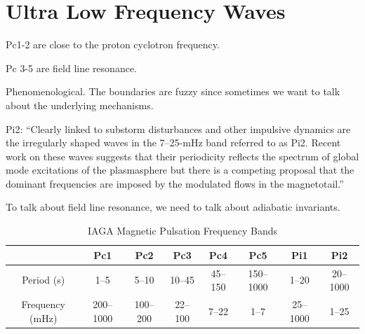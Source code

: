 
\chapter{Ultra Low Frequency Waves}
  \label{ch_waves}



Pc1-2 are close to the proton cyclotron frequency. 

Pc 3-5 are field line resonance. 

Phenomenological. The boundaries are fuzzy since sometimes we want to talk about the underlying mechanisms. 

Pi2: ``Clearly linked to substorm disturbances and other impulsive dynamics are the irregularly shaped waves in the 7--25-mHz band referred to as Pi2. Recent work on these waves suggests that their periodicity reflects the spectrum of global mode excitations of the plasmasphere but there is a competing proposal that the dominant frequencies are imposed by the modulated flows in the magnetotail.''\cite{kivelson_2006}

To talk about field line resonance, we need to talk about adiabatic invariants. 


\begin{longtable}{ @{\extracolsep{\fill}} cccccccc @{\extracolsep{\fill}} }
  \caption[IAGA Magnetic Pulsation Frequency Bands]{IAGA Magnetic Pulsation Frequency Bands\cite{jacobs_1964}}
  \label{tab_iaga} \\

  \toprule
  &
  Pc1 &
  Pc2 &
  Pc3 &
  Pc4 &
  Pc5 &
  Pi1 &
  Pi2 \\
  \midrule
  \endfirsthead

  \bottomrule
  \endlastfoot

  Period (\si{\second}) &
  1--5 &
  5--10 &
  10--45 &
  45--150 &
  150--1000 &
  1--20 &
  20--1000 \\

  Frequency (\si{\mHz})&
  200--1000 &
  100--200 &
  22--100 &
  7--22 &
  1--7 &
  25--1000 &
  1--25 \\

\end{longtable}



